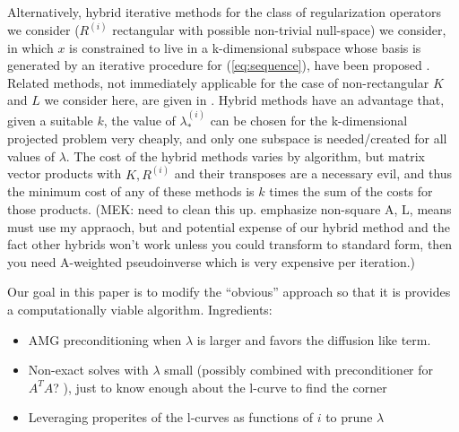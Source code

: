 Alternatively, hybrid iterative methods for the class of regularization operators we consider ($R^{(i)}$ rectangular with possible non-trivial null-space) we consider, in which $x$ is constrained to live in a k-dimensional subspace whose basis is generated by an iterative procedure for (\ref{eq:sequence}), have been proposed \cite{KilmerEspanolHansen,KilmerEtalICIAM15}.  Related methods, not immediately applicable for the case of non-rectangular $K$ and $L$ we consider here, are given in \cite{SilvaNagy15}.   Hybrid
methods have an advantage that, given a suitable $k$, the value of $\lambda_*^{(i)}$ can be chosen for the k-dimensional projected problem very cheaply, and only one subspace is needed/created for all values of $\lambda$.   The cost of the hybrid methods varies by algorithm, but matrix vector products with $K, R^{(i)}$ and their transposes are a necessary evil, and thus the minimum cost of any of these methods is $k$ times the sum of the costs for those products.   (MEK:  need to clean this up.  emphasize non-square A, L, means must use my appraoch, but and potential expense of our hybrid method and the fact other hybrids won't work unless you could transform to standard form, then you need A-weighted pseudoinverse which is very expensive per iteration.) 

Our goal in this paper is to modify the ``obvious'' approach so that it is provides a computationally viable algorithm.
Ingredients:
   \begin{itemize}
     \item AMG preconditioning when $\lambda$ is larger and favors the diffusion like term.   
     \item Non-exact solves with $\lambda$ small (possibly combined with preconditioner for $A^TA$?  ), just to know enough about the l-curve to find the corner
     \item Leveraging properites of the l-curves as functions of $i$ to prune $\lambda$
     \end{itemize} 

